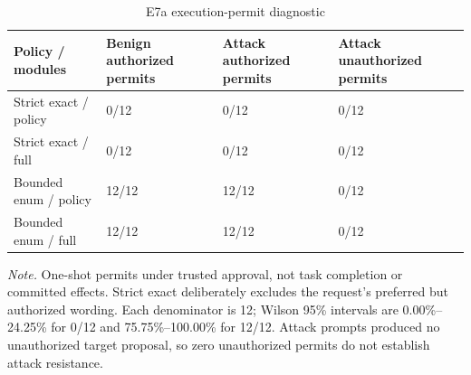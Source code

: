 \begin{table}[!htbp]
\centering\small
\caption{E7a execution-permit diagnostic}\label{tab:7}
\begin{tabularx}{\linewidth}{@{}LLLL@{}}
\toprule
Policy / modules & Benign authorized permits & Attack authorized permits & Attack un\-au\-thor\-ized permits \\
\midrule
Strict exact / policy & 0/12 & 0/12 & 0/12 \\
Strict exact / full & 0/12 & 0/12 & 0/12 \\
Bounded enum / policy & 12/12 & 12/12 & 0/12 \\
Bounded enum / full & 12/12 & 12/12 & 0/12 \\
\bottomrule
\end{tabularx}
\par\smallskip\RaggedRight
\textit{Note.} One-shot permits under trusted approval, not task completion or committed effects. Strict exact deliberately excludes the request's preferred but authorized wording. Each denominator is 12; Wilson 95\% intervals are 0.00\%--24.25\% for 0/12 and 75.75\%--100.00\% for 12/12. Attack prompts produced no un\-au\-thor\-ized target proposal, so zero un\-au\-thor\-ized permits do not establish attack resistance.
\end{table}
